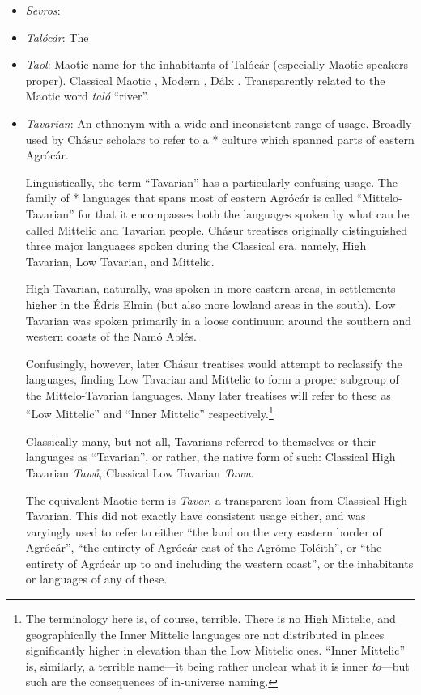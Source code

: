 \documentclass{article}
\begin{document}
\begin{itemize}
 \item \textit{Sevros}:

 \item \textit{Talócár}: The

 \item \textit{Taol}: Maotic name for the inhabitants of Talócár (especially Maotic speakers proper). Classical Maotic , Modern , Dálx . Transparently related to the Maotic word \textit{taló} ``river''.

 \item \textit{Tavarian}: An ethnonym with a wide and inconsistent range of usage. Broadly used by Chásur scholars to refer to a * culture which spanned parts of eastern Agrócár.

 Linguistically, the term ``Tavarian'' has a particularly confusing usage. The family of * languages that spans most of eastern Agrócár is called ``Mittelo-Tavarian'' for that it encompasses both the languages spoken by what can be called Mittelic and Tavarian people. Chásur treatises originally distinguished three major languages spoken during the Classical era, namely, High Tavarian, Low Tavarian, and Mittelic.

 High Tavarian, naturally, was spoken in more eastern areas, in settlements higher in the Édris Elmin (but also more lowland areas in the south). Low Tavarian was spoken primarily in a loose continuum around the southern and western coasts of the Namó Ablés.

 Confusingly, however, later Chásur treatises would attempt to reclassify the languages, finding Low Tavarian and Mittelic to form a proper subgroup of the Mittelo-Tavarian languages. Many later treatises will refer to these as ``Low Mittelic'' and ``Inner Mittelic'' respectively.\footnote{The terminology here is, of course, terrible. There is no High Mittelic, and geographically the Inner Mittelic languages are not distributed in places significantly higher in elevation than the Low Mittelic ones. ``Inner Mittelic'' is, similarly, a terrible name—it being rather unclear what it is inner \emph{to}—but such are the consequences of in-universe naming.}

 Classically many, but not all, Tavarians referred to themselves or their languages as ``Tavarian'', or rather, the native form of such: Classical High Tavarian \textit{Tawå}, Classical Low Tavarian \textit{Tawu}.

 The equivalent Maotic term is \textit{Tavar}, a transparent loan from Classical High Tavarian. This did not exactly have consistent usage either, and was varyingly used to refer to either ``the land on the very eastern border of Agrócár'', ``the entirety of Agrócár east of the Agróme Toléith'', or ``the entirety of Agrócár up to and including the western coast'', or the inhabitants or languages of any of these.


\end{itemize}
\end{document}
